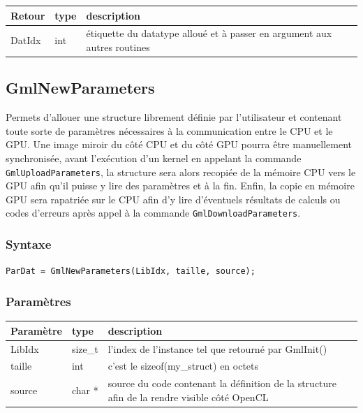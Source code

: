 \documentclass[a4paper,12pt]{article}
\begin{document}
\medskip

\begin{tabular}{|m{2cm}|m{1.5cm}|m{10.5cm}|}
\hline
Retour     & type   & description \\
\hline
DatIdx     & int    & étiquette du datatype alloué et à passer en argument aux autres routines \\
\hline
\end{tabular}


\subsection{GmlNewParameters}

Permets d'allouer une structure librement définie par l'utilisateur et contenant toute sorte de paramètres nécessaires à la communication entre le CPU et le GPU.
Une image miroir du côté CPU et du côté GPU pourra être manuellement synchronisée, avant l'exécution d'un kernel en appelant la commande {\tt GmlUploadParameters}, la structure sera alors recopiée de la mémoire CPU vers le GPU afin qu'il puisse y lire des paramètres et à la fin.
Enfin, la copie en mémoire GPU sera rapatriée sur le CPU afin d'y lire d'éventuels résultats de calculs ou codes d'erreurs après appel à la commande {\tt GmlDownloadParameters}.

\subsubsection*{Syntaxe}

{\tt ParDat = GmlNewParameters(LibIdx, taille, source);}

\subsubsection*{Paramètres}

\begin{tabular}{|m{2cm}|m{1.5cm}|m{10.5cm}|}
\hline
Paramètre  & type    & description \\
\hline
LibIdx     & size\_t & l'index de l'instance tel que retourné par GmlInit() \\
\hline
taille     & int     & c'est le sizeof(my\_struct) en octets \\
\hline
source     & char *  & source du code contenant la définition de la structure afin de la rendre visible côté OpenCL \\
\hline
\end{tabular}

\medskip
\end{document}
